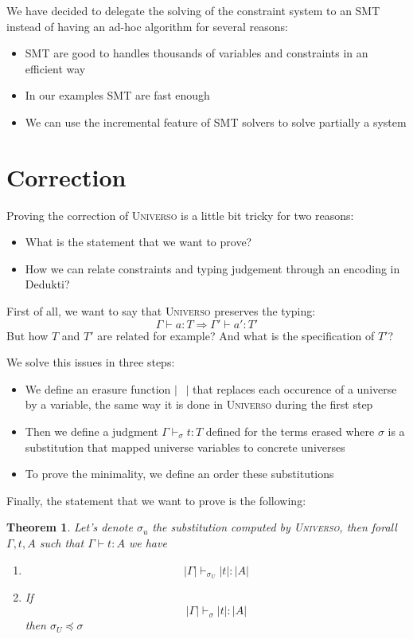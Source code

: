 \documentclass[conference]{IEEEtran}
\newtheorem{theorem}{Theorem}
\newcommand{\universo}{\textsc{Universo}}
\begin{document}
We have decided to delegate the solving of the constraint system to an SMT instead of having an ad-hoc algorithm for several reasons:
\begin{itemize}
\item SMT are good to handles thousands of variables and constraints in an efficient way
\item In our examples SMT are fast enough
\item We can use the incremental feature of SMT solvers to solve partially a system
\end{itemize}

\section{Correction}

Proving the correction of \universo{} is a little bit tricky for two reasons:
\begin{itemize}
\item What is the statement that we want to prove?
\item How we can relate constraints and typing judgement through an encoding in Dedukti?
\end{itemize}

First of all, we want to say that \universo{} preserves the typing:
\[ \Gamma \vdash a : T \Rightarrow \Gamma' \vdash a' : T'\]
But how \(T\) and \(T'\) are related for example? And what is the specification of \(T'\)?

We solve this issues in three steps:
\begin{itemize}
\item We define an erasure function \(| \phantom{A}|\) that replaces each occurence of a universe by a variable, the same way it is done in \universo{} during the first step
\item Then we define a judgment \(\Gamma \vdash_{\sigma} t : T\) defined for the terms erased where \(\sigma\) is a substitution that mapped universe variables to concrete universes
\item To prove the minimality, we define an order these substitutions
\end{itemize}

Finally, the statement that we want to prove is the following:

\begin{theorem}
  Let's denote \(\sigma_u\) the substitution computed by \universo, then forall \(\Gamma, t, A\) such that \(\Gamma \vdash t : A\) we have
  \begin{enumerate}
  \item \[ |\Gamma| \vdash_{\sigma_U} |t| : |A| \]
  \item If \[ |\Gamma| \vdash_{\sigma} |t| : |A| \] then \(\sigma_U \preceq \sigma \)
  \end{enumerate}
\end{theorem}
\end{document}
